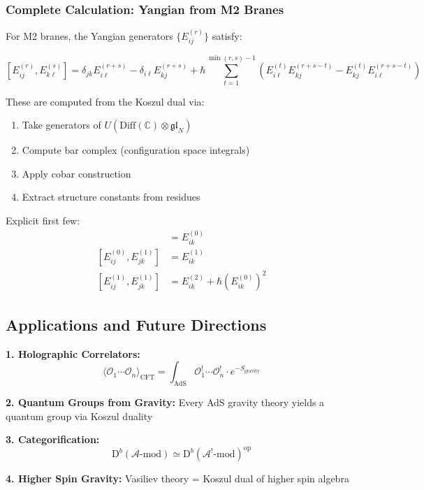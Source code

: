 \subsubsection{Complete Calculation: Yangian from M2 Branes}

\begin{calculation}
For M2 branes, the Yangian generators $\{E_{ij}^{(r)}\}$ satisfy:

$$[E_{ij}^{(r)}, E_{k\ell}^{(s)}] = \delta_{jk}E_{i\ell}^{(r+s)} - \delta_{i\ell}E_{kj}^{(r+s)} + \hbar \sum_{t=1}^{\min(r,s)-1} \left(E_{i\ell}^{(t)}E_{kj}^{(r+s-t)} - E_{kj}^{(t)}E_{i\ell}^{(r+s-t)}\right)$$

These are computed from the Koszul dual via:
\begin{enumerate}
\item Take generators of $U(\text{Diff}(\mathbb{C}) \otimes \mathfrak{gl}_N)$
\item Compute bar complex (configuration space integrals)
\item Apply cobar construction
\item Extract structure constants from residues
\end{enumerate}

Explicit first few:
\begin{align}
[E_{ij}^{(0)}, E_{jk}^{(0)}] &= E_{ik}^{(0)} \\
[E_{ij}^{(0)}, E_{jk}^{(1)}] &= E_{ik}^{(1)} \\
[E_{ij}^{(1)}, E_{jk}^{(1)}] &= E_{ik}^{(2)} + \hbar(E_{ik}^{(0)})^2
\end{align}
\end{calculation}

\subsection{Applications and Future Directions}

\begin{applications}
\textbf{1. Holographic Correlators:}
$$\langle \mathcal{O}_1 \cdots \mathcal{O}_n \rangle_{\text{CFT}} = \int_{\text{AdS}} \mathcal{O}_1^! \cdots \mathcal{O}_n^! \cdot e^{-S_{\text{gravity}}}$$

\textbf{2. Quantum Groups from Gravity:}
Every AdS gravity theory yields a quantum group via Koszul duality

\textbf{3. Categorification:}
$$\text{D}^b(\mathcal{A}\text{-mod}) \simeq \text{D}^b(\mathcal{A}^!\text{-mod})^{\text{op}}$$

\textbf{4. Higher Spin Gravity:}
Vasiliev theory = Koszul dual of higher spin algebra
\end{applications}

